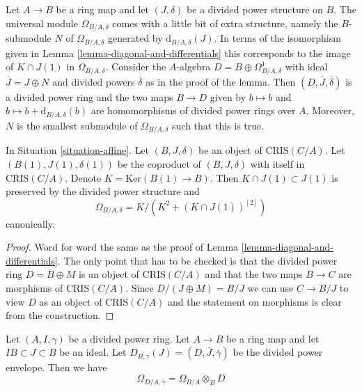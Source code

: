 \begin{remark}
\label{remark-filtration-differentials}
Let $A \to B$ be a ring map and let $(J, \delta)$ be a divided
power structure on $B$. The universal module $\Omega_{B/A, \delta}$
comes with a little bit of extra structure, namely the $B$-submodule
$N$ of $\Omega_{B/A, \delta}$ generated by $\text{d}_{B/A, \delta}(J)$.
In terms of the isomorphism given in
Lemma \ref{lemma-diagonal-and-differentials}
this corresponds to the image of
$K \cap J(1)$ in $\Omega_{B/A, \delta}$. Consider the $A$-algebra
$D = B \oplus \Omega^1_{B/A, \delta}$ with ideal $\bar J = J \oplus N$
and divided powers $\bar \delta$ as in the proof of the lemma.
Then $(D, \bar J, \bar \delta)$ is a divided power ring
and the two maps $B \to D$ given by $b \mapsto b$ and
$b \mapsto b + \text{d}_{B/A, \delta}(b)$
are homomorphisms of divided power rings over $A$. Moreover, $N$
is the smallest submodule of $\Omega_{B/A, \delta}$ such that this is true.
\end{remark}

\begin{lemma}
\label{lemma-diagonal-and-differentials-affine-site}
In Situation \ref{situation-affine}.
Let $(B, J, \delta)$ be an object of $\text{CRIS}(C/A)$.
Let $(B(1), J(1), \delta(1))$ be the coproduct of $(B, J, \delta)$
with itself in $\text{CRIS}(C/A)$. Denote
$K = \text{Ker}(B(1) \to B)$. Then $K \cap J(1) \subset J(1)$
is preserved by the divided power structure and
$$
\Omega_{B/A, \delta} = K/ \left(K^2 + (K \cap J(1))^{[2]}\right)
$$
canonically.
\end{lemma}

\begin{proof}
Word for word the same as the proof of
Lemma \ref{lemma-diagonal-and-differentials}.
The only point that has to be checked is that the
divided power ring $D = B \oplus M$ is an object of $\text{CRIS}(C/A)$
and that the two maps $B \to C$ are morphisms of $\text{CRIS}(C/A)$.
Since $D/(J \oplus M) = B/J$ we can use $C \to B/J$ to view
$D$ as an object of $\text{CRIS}(C/A)$
and the statement on morphisms is clear from the construction.
\end{proof}

\begin{lemma}
\label{lemma-module-differentials-divided-power-envelope}
Let $(A, I, \gamma)$ be a divided power ring. Let $A \to B$ be a ring
map and let $IB \subset J \subset B$ be an ideal. Let
$D_{B, \gamma}(J) = (D, \bar J, \bar \gamma)$ be the divided power envelope.
Then we have
$$
\Omega_{D/A, \bar\gamma} = \Omega_{B/A} \otimes_B D
$$
\end{lemma}

